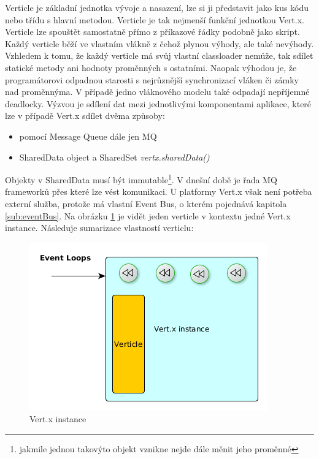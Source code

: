 Verticle je základní jednotka vývoje a nasazení, lze si ji představit jako kus kódu nebo třídu s hlavní metodou. Verticle je tak nejmenší funkční jednotkou Vert.x. Verticle lze spouštět samostatně přímo z příkazové řádky podobně jako skript. Každý verticle běží ve vlastním vlákně z čehož plynou výhody, ale také nevýhody. Vzhledem k tomu, že každý verticle má svůj vlastní classloader nemůže, tak sdílet statické metody ani hodnoty proměnných s ostatními. Naopak výhodou je, že programátorovi odpadnou starosti s nejrůznější synchronizací vláken či zámky nad proměnnýma. V případě jedno vláknového modelu také odpadají nepříjemné deadlocky. Výzvou je sdílení dat mezi jednotlivými komponentami aplikace, které lze v případě Vert.x sdílet dvěma způsoby:
\begin{itemize}
\item{pomocí Message Queue\cite{mq} dále jen MQ}
\item{SharedData object a SharedSet \emph{vertx.sharedData()}}
\end{itemize}
Objekty v SharedData musí být immutable\footnote{jakmile jednou takovýto objekt vznikne nejde dále měnit jeho proměnné}. V dnešní době je řada MQ frameworků přes které lze vést komunikaci. U platformy Vert.x však není potřeba externí služba, protože má vlastní Event Bus, o kterém pojednává kapitola \ref{sub:eventBus}. Na obrázku \ref{fig:instance} je vidět jeden verticle v kontextu jedné Vert.x instance. Následuje sumarizace vlastností verticlu:
\begin{figure}[h]
\begin{centering}
\includegraphics[scale=0.5]{obrazky/instance}
\par\end{centering}
\caption{Vert.x instance \label{fig:instance}}
\end{figure}

